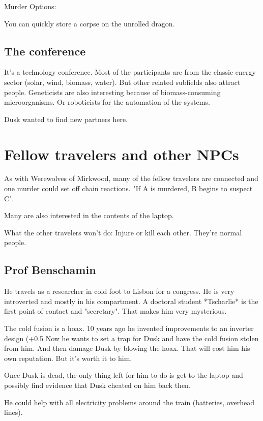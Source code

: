 \documentclass{book}
\begin{document}
Murder Options:

You can quickly store a corpse on the unrolled dragon.

\subsection{The conference}


It's a technology conference. Most of the participants are from the classic energy sector (solar, wind, biomass, water). But other related subfields also attract people. Geneticists are also interesting because of biomass-consuming microorganisms. Or roboticists for the automation of the systems.

Dusk wanted to find new partners here.


\section{Fellow travelers and other NPCs}


As with Werewolves of Mirkwood, many of the fellow travelers are connected and one murder could set off chain reactions. "If A is murdered, B begins to suspect C".

Many are also interested in the contents of the laptop.

What the other travelers won't do: Injure or kill each other. They're normal people.

\subsection{Prof Benschamin}

He travels as a researcher in cold foot to Lisbon for a congress. He is very introverted and mostly in his compartment. A doctoral student *Tscharlie* is the first point of contact and "secretary". That makes him very mysterious.

The cold fusion is a hoax. 10 years ago he invented improvements to an inverter design (+0.5%
Now he wants to set a trap for Dusk and have the cold fusion stolen from him. And then damage Dusk by blowing the hoax. That will cost him his own reputation. But it's worth it to him.

Once Dusk is dead, the only thing left for him to do is get to the laptop and possibly find evidence that Dusk cheated on him back then.

He could help with all electricity problems around the train (batteries, overhead lines).
\end{document}
